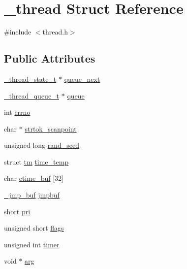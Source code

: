 \hypertarget{struct__thread}{}\section{\+\_\+thread Struct Reference}
\label{struct__thread}


{\ttfamily \#include $<$thread.\+h$>$}

\subsection*{Public Attributes}
\begin{DoxyCompactItemize}
\item 
\mbox{\hyperlink{thread_8h_ab20cd1a493b8dba6200fdc5912bec0d0}{\+\_\+thread\+\_\+state\+\_\+t}} $\ast$ \mbox{\hyperlink{struct__thread_aaa10b9f1f435fc73735ad02eb5e617c6}{queue\+\_\+next}}
\item 
\mbox{\hyperlink{thread_8h_acb75659012caf2e738ff936db5473447}{\+\_\+thread\+\_\+queue\+\_\+t}} $\ast$ \mbox{\hyperlink{struct__thread_a26c9ef87b799f4ed1e0f9a3824385537}{queue}}
\item 
int \mbox{\hyperlink{struct__thread_afd1d4c8cdaccd36ad60cde7d96c435eb}{errno}}
\item 
char $\ast$ \mbox{\hyperlink{struct__thread_a27b89cf9b6b70540b133827f387698df}{strtok\+\_\+scanpoint}}
\item 
unsigned long \mbox{\hyperlink{struct__thread_aea692689f0651abeafb8dbce076c8f40}{rand\+\_\+seed}}
\item 
struct \mbox{\hyperlink{structtm}{tm}} \mbox{\hyperlink{struct__thread_ae8c07f7023ee453f62dc51b2a9c1b50d}{time\+\_\+temp}}
\item 
char \mbox{\hyperlink{struct__thread_a9e69f2ea7a1a889bea1c05105d9f2354}{ctime\+\_\+buf}} \mbox{[}32\mbox{]}
\item 
\mbox{\hyperlink{jmpbuf_8h_a39955153a4f32ebff06ff99d7ee9a05e}{\+\_\+jmp\+\_\+buf}} \mbox{\hyperlink{struct__thread_a7e89c67c1bb923396cb5d7a76afb4091}{jmpbuf}}
\item 
short \mbox{\hyperlink{struct__thread_a74c458464917ed3d1f548fccd9c906d7}{pri}}
\item 
unsigned short \mbox{\hyperlink{struct__thread_ade2246148b4c3de39d7c867f10addb39}{flags}}
\item 
unsigned int \mbox{\hyperlink{struct__thread_aa2d46b239912575b51c5d254fc588717}{timer}}
\item 
void $\ast$ \mbox{\hyperlink{struct__thread_a33b6b5cd25cf365d42d7c866cada4446}{arg}}

\end{DoxyCompactItemize}
